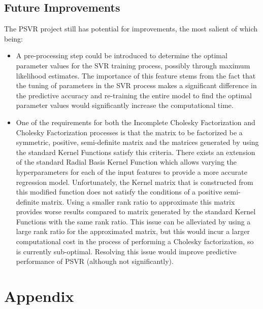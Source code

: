 \documentclass[12pt]{article}
\newcounter{reportpage}
\begin{document}
\subsection{Future Improvements}
The PSVR project still has potential for improvements, the most salient of which being:
\begin{itemize}
\item A pre-processing step could be introduced to determine the optimal parameter values for the SVR training process, possibly through maximum likelihood estimates. The importance of this feature stems from the fact that the tuning of parameters in the SVR process makes a significant difference in the predictive accuracy and re-training the entire model to find the optimal parameter values would significantly increase the computational time.
\item One of the requirements for both the Incomplete Cholesky Factorization and Cholesky Factorization processes is that the matrix to be factorized be a symmetric, positive, semi-definite matrix and the matrices generated by using the standard Kernel Functions satisfy this criteria. There exists an extension of the standard Radial Basis Kernel Function which allows varying the hyperparameters for each of the input features to provide a more accurate regression model. Unfortunately, the Kernel matrix that is constructed from this modified function does not satisfy the conditions of a positive semi-definite matrix. Using a smaller rank ratio to approximate this matrix provides worse results compared to matrix generated by the standard Kernel Functions with the same rank ratio. This issue can be alleviated by using a large rank ratio for the approximated matrix, but this would incur a larger computational cost in the process of performing a Cholesky factorization, so is currently sub-optimal. Resolving this issue would improve predictive performance of PSVR (although not significantly).
\end{itemize}
\cleardoublepage
{}
\setcounter{page}{\value{reportpage}}
\section{Appendix}
\end{document}
